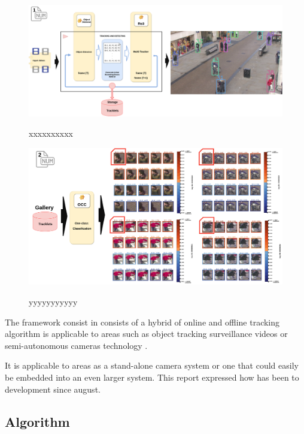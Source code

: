 \documentclass[a4paper]{article}
\begin{document}
\begin{figure}[htp]
    \centering
    \includegraphics[width=15cm]{imgs/framework_part1.png}
    \label{fig:framework_part1}
    \caption[test framework part 1]{xxxxxxxxxx}
\end{figure}


\begin{figure}[htp]
    \centering
    \includegraphics[width=15cm]{imgs/framework_part2.png}
    \label{fig:framework_part2}
    \caption[test framework part 2]{yyyyyyyyyyy}
\end{figure}




The framework consist in consists of a hybrid of online and offline tracking algorithm is applicable to areas such as object tracking surveillance videos or semi-autonomous cameras technology \cite{re3}.



It is applicable to areas as a stand-alone camera system or one that could easily be embedded into an even larger system. This report expressed how has been to development since august.


\subsection{Algorithm}
\end{document}
